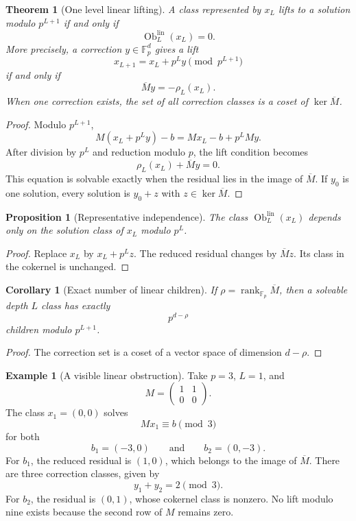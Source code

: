 \documentclass{aomart}
\newtheorem{theorem}{Theorem}[section]
\newtheorem{proposition}[proposition]{Proposition}
\newtheorem{corollary}[corollary]{Corollary}
\theoremstyle{definition}
\newtheorem{example}[example]{Example}
\theoremstyle{remark}
\newcommand{\FF}{\mathbb F}
\newcommand{\rank}{\operatorname{rank}}
\begin{document}
\begin{theorem}[One level linear lifting]\label{thm:linear_lifting}
A class represented by \(x_L\) lifts to a solution modulo \(p^{L+1}\) if and only if
\[
\boxed{
\operatorname{Ob}^{\mathrm{lin}}_L(x_L)=0.
}
\]
More precisely, a correction \(y\in\FF_p^d\) gives a lift
\[
x_{L+1}=x_L+p^Ly
\pmod {p^{L+1}}
\]
if and only if
\[
\boxed{
\overline My=-\rho_L(x_L).
}
\]
When one correction exists, the set of all correction classes is a coset of \(\ker\overline M\).
\end{theorem}

\begin{proof}
Modulo \(p^{L+1}\),
\[
M(x_L+p^Ly)-b
=
Mx_L-b+p^LMy.
\]
After division by \(p^L\) and reduction modulo \(p\), the lift condition becomes
\[
\rho_L(x_L)+\overline My=0.
\]
This equation is solvable exactly when the residual lies in the image of \(\overline M\). If \(y_0\) is one solution, every solution is \(y_0+z\) with \(z\in\ker\overline M\).
\end{proof}

\begin{proposition}[Representative independence]\label{prop:linear_obstruction_independence}
The class \(\operatorname{Ob}^{\mathrm{lin}}_L(x_L)\) depends only on the solution class of \(x_L\) modulo \(p^L\).
\end{proposition}

\begin{proof}
Replace \(x_L\) by \(x_L+p^Lz\). The reduced residual changes by \(\overline Mz\). Its class in the cokernel is unchanged.
\end{proof}

\begin{corollary}[Exact number of linear children]\label{cor:linear_child_count}
If \(\rho=\rank_{\FF_p}\overline M\), then a solvable depth \(L\) class has exactly
\[
\boxed{
p^{d-\rho}
}
\]
children modulo \(p^{L+1}\).
\end{corollary}

\begin{proof}
The correction set is a coset of a vector space of dimension \(d-\rho\).
\end{proof}

\begin{example}[A visible linear obstruction]\label{ex:linear_lift_obstruction}
Take \(p=3\), \(L=1\), and
\[
M=
\begin{pmatrix}
1&1\\
0&0
\end{pmatrix}.
\]
The class \(x_1=(0,0)\) solves
\[
Mx_1\equiv b\pmod3
\]
for both
\[
b_1=(-3,0)
\qquad\text{and}\qquad
b_2=(0,-3).
\]
For \(b_1\), the reduced residual is \((1,0)\), which belongs to the image of \(\overline M\). There are three correction classes, given by
\[
y_1+y_2=2
\pmod3.
\]
For \(b_2\), the residual is \((0,1)\), whose cokernel class is nonzero. No lift modulo nine exists because the second row of \(M\) remains zero.
\end{example}
\end{document}
